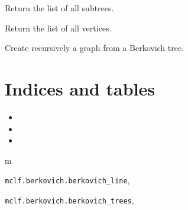 \documentclass[letterpaper,10pt,english]{sphinxmanual}
\begin{document}
\begin{fulllineitems}
\begin{fulllineitems}
\end{fulllineitems}


\begin{fulllineitems}
\label{berkovich_trees:mclf.berkovich.berkovich_trees.BerkovichTree.subtrees}
Return the list of all subtrees.

\end{fulllineitems}


\begin{fulllineitems}
\label{berkovich_trees:mclf.berkovich.berkovich_trees.BerkovichTree.vertices}
Return the list of all vertices.

\end{fulllineitems}


\end{fulllineitems}


\begin{fulllineitems}
\label{berkovich_trees:mclf.berkovich.berkovich_trees.create_graph_recursive}
Create recursively a graph from a Berkovich tree.

\end{fulllineitems}



\chapter{Indices and tables}
\label{index:indices-and-tables}\begin{itemize}
\item {} 

\item {} 

\item {} 

\end{itemize}


\renewcommand{\indexname}{Python Module Index}
\begin{theindex}
\def\bigletter#1{{\Large\sffamily#1}\nopagebreak\vspace{1mm}}
\bigletter{m}
\item {\texttt{mclf.berkovich.berkovich\_line}}, \pageref{berkovich_line:module-mclf.berkovich.berkovich_line}
\item {\texttt{mclf.berkovich.berkovich\_trees}}, \pageref{berkovich_trees:module-mclf.berkovich.berkovich_trees}
\end{theindex}

\renewcommand{\indexname}{Index}
\printindex
\end{document}
